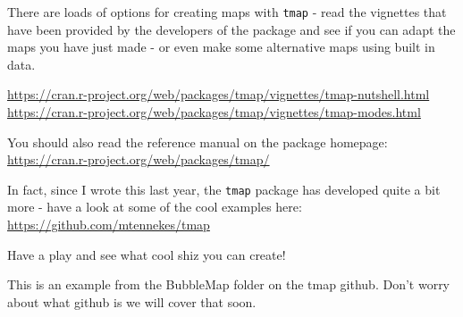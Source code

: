 \documentclass[]{book}
\begin{document}
There are loads of options for creating maps with \texttt{tmap} - read the vignettes that have been provided by the developers of the package and see if you can adapt the maps you have just made - or even make some alternative maps using built in data.

\url{https://cran.r-project.org/web/packages/tmap/vignettes/tmap-nutshell.html} \url{https://cran.r-project.org/web/packages/tmap/vignettes/tmap-modes.html}

You should also read the reference manual on the package homepage: \url{https://cran.r-project.org/web/packages/tmap/}

In fact, since I wrote this last year, the \texttt{tmap} package has developed quite a bit more - have a look at some of the cool examples here: \url{https://github.com/mtennekes/tmap}

Have a play and see what cool shiz you can create!

This is an example from the BubbleMap folder on the tmap github. Don't worry about what github is we will cover that soon.
\end{document}
